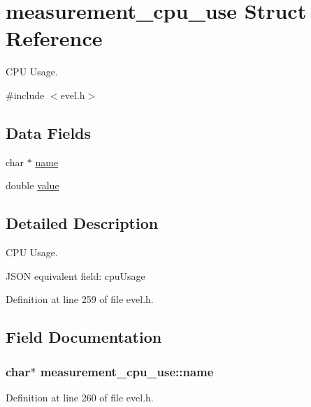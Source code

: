 \hypertarget{structmeasurement__cpu__use}{}\section{measurement\+\_\+cpu\+\_\+use Struct Reference}
\label{structmeasurement__cpu__use}


C\+P\+U Usage.  




{\ttfamily \#include $<$evel.\+h$>$}

\subsection*{Data Fields}
\begin{DoxyCompactItemize}
\item 
char $\ast$ \hyperlink{structmeasurement__cpu__use_a41e932f1d0638eb67a0e3fc9312bec9c}{name}
\item 
double \hyperlink{structmeasurement__cpu__use_adbd49f71fba95c7c1c06caf1d443ce47}{value}
\end{DoxyCompactItemize}


\subsection{Detailed Description}
C\+P\+U Usage. 

J\+S\+O\+N equivalent field\+: cpu\+Usage 

Definition at line 259 of file evel.\+h.



\subsection{Field Documentation}
\hypertarget{structmeasurement__cpu__use_a41e932f1d0638eb67a0e3fc9312bec9c}{}
\subsubsection[{name}]{\setlength{\rightskip}{0pt plus 5cm}char$\ast$ measurement\+\_\+cpu\+\_\+use\+::name}\label{structmeasurement__cpu__use_a41e932f1d0638eb67a0e3fc9312bec9c}


Definition at line 260 of file evel.\+h.

\hypertarget{structmeasurement__cpu__use_adbd49f71fba95c7c1c06caf1d443ce47}{}
